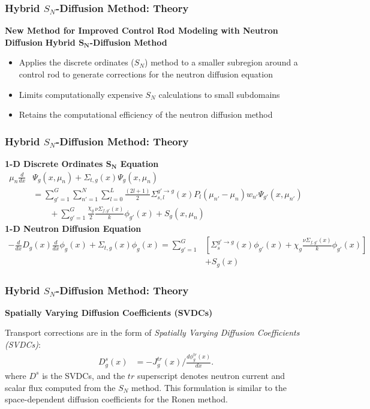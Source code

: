 \begin{frame}
  \frametitle{Hybrid $S_N$-Diffusion Method: Theory}
  \begin{block}{\textbf{New Method for Improved Control Rod Modeling with Neutron Diffusion}}
    \textbf{Hybrid $\bm{S_N}$-Diffusion Method}
    \begin{itemize}
      \item Applies the discrete ordinates ($S_N$) method to a smaller subregion around a
        control rod to generate corrections for the neutron diffusion equation
      \item Limits computationally expensive $S_N$ calculations to small subdomains
      \item Retains the computational efficiency of the neutron diffusion method
    \end{itemize}
  \end{block}
\end{frame}

\begin{frame}
  \frametitle{Hybrid $S_N$-Diffusion Method: Theory}
  \textbf{1-D Discrete Ordinates $\bm{S_N}$ Equation}
  \begin{align}
    \mu_n \frac{d}{dx}&\Psi_g(x, \mu_n) + \Sigma_{t,g}(x)\Psi_g(x, \mu_n) \nonumber \\
                      &=\sum^G_{g'=1} \sum^N_{n'=1} \sum^L_{l=0}
                        \frac{\left(2l+1\right)}{2} \Sigma^{g'\rightarrow g}_{s,l}(x)
                        P_l(\mu_{n'} - \mu_n) w_{n'}\Psi_{g'}(x,\mu_{n'}) \nonumber \\
                      &\qquad + \sum^G_{g'=1} \frac{\chi_g}{2}
                        \frac{\nu\Sigma_{f,g'}(x)}{k} \phi_{g'}(x) + S_g(x,\mu_n)
    \label{eq:1d-sn}
  \end{align}
  \textbf{1-D Neutron Diffusion Equation}
  \begin{align}
    -\frac{d}{dx} D_g(x) \frac{d}{dx} \phi_g(x) + \Sigma_{t,g}(x) \phi_g(x) = \sum^G_{g'=1}&\left[
      \Sigma_s^{g'\rightarrow g}(x)\phi_{g'}(x) + \chi_g\frac{\nu\Sigma_{f,g'}(x)}{k}
    \phi_{g'}(x)\right] \nonumber \\
                                   &+ S_g(x)
    \label{eq:1d-diff}
  \end{align}
\end{frame}

\begin{frame}
  \frametitle{Hybrid $S_N$-Diffusion Method: Theory}
  \textbf{Spatially Varying Diffusion Coefficients (SVDCs)}
  \vspace{.3cm}

  Transport corrections are in the form of \textit{Spatially Varying Diffusion Coefficients
  (SVDCs)}:
  \begin{align}
    D^s_g(x) &= -J^{tr}_g(x)\bigg/\frac{d\phi^{tr}_g(x)}{dx}. \label{eq:svdc}
  \end{align}
  where $D^s$ is the \glspl{SVDC}, and the $tr$ superscript denotes neutron
  current and scalar flux computed from the $S_N$ method. This formulation is similar to the
  space-dependent diffusion coefficients for the Ronen method.
\end{frame}

